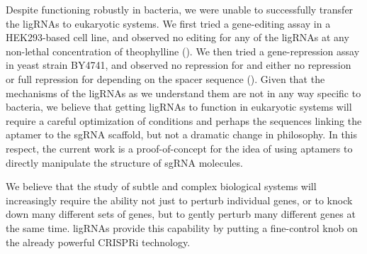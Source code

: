 \documentclass[10pt,oneside]{article}
\begin{document}
Despite functioning robustly in bacteria, we were unable to successfully transfer the ligRNAs to eukaryotic systems.  We first tried a gene-editing assay in a HEK293-based cell line, and observed no editing for any of the ligRNAs at any non-lethal concentration of theophylline ().  We then tried a gene-repression assay in yeast strain BY4741, and observed no repression for \ligrnaF{} and either no repression or full repression for \ligrnaB{} depending on the spacer sequence ().  Given that the mechanisms of the ligRNAs as we understand them are not in any way specific to bacteria, we believe that getting ligRNAs to function in eukaryotic systems will require a careful optimization of conditions and perhaps the sequences linking the aptamer to the sgRNA scaffold, but not a dramatic change in philosophy.  In this respect, the current work is a proof-of-concept for the idea of using aptamers to directly manipulate the structure of sgRNA molecules.
% 
% 



We believe that the study of subtle and complex biological systems will increasingly require the ability not just to perturb individual genes, or to knock down many different sets of genes, but to gently perturb many different genes at the same time.  ligRNAs provide this capability by putting a fine-control knob on the already powerful CRISPRi technology.
\end{document}
